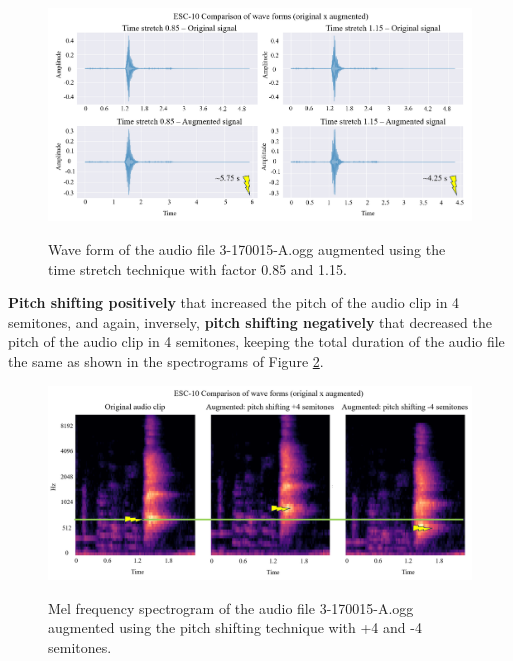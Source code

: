 \begin{figure}[htbp]
    \raggedright
        \caption{Wave form of the audio file 3-170015-A.ogg augmented using the time stretch technique with factor 0.85 and 1.15.}
        \includegraphics[width=.98\textwidth]{resources/images/050-methods/Methods_augmentation_time_stretching.png}
        \label{fig:methods_augmentation_time_stretch}
\end{figure}

\textbf{Pitch shifting positively} that increased the pitch of the audio clip in 4 semitones, and again, inversely, \textbf{pitch shifting negatively} that decreased the pitch of the audio clip in 4 semitones, keeping the total duration of the audio file the same as shown in the spectrograms of Figure \ref{fig:methods_augmentation_pitch_shifting}. 

\begin{figure}[htbp]
    \raggedright
        \caption{Mel frequency spectrogram of the audio file 3-170015-A.ogg augmented using the pitch shifting technique with +4 and -4 semitones.}
        \includegraphics[width=.98\textwidth]{resources/images/050-methods/Methods_augmentation_pitch_shifting.png}
        \label{fig:methods_augmentation_pitch_shifting}
\end{figure}

